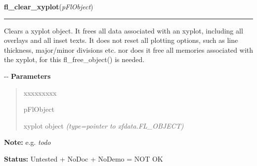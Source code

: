 \hspace{.8\funcindent}\begin{boxedminipage}{\funcwidth}

    \raggedright \textbf{fl\_clear\_xyplot}(\textit{pFlObject})

    \vspace{-1.5ex}

    \rule{\textwidth}{0.5\fboxrule}
\setlength{\parskip}{2ex}

Clears a xyplot object. It frees all data associated with an xyplot,
including all overlays and all inset texts. It does not reset all
plotting options, such as line thickness, major/minor divisions etc. nor
does it free all memories associated with the xyplot, for this
fl\_free\_object() is needed.

-{}-
\setlength{\parskip}{1ex}
      \textbf{Parameters}
      \vspace{-1ex}

      \begin{quote}
        \begin{Ventry}{xxxxxxxxx}

          \item[pFlObject]


xyplot object
            {\it (type=pointer to xfdata.FL\_OBJECT)}

        \end{Ventry}

      \end{quote}

\textbf{Note:} 
e.g. \emph{todo}


\textbf{Status:} 
Untested + NoDoc + NoDemo = NOT OK


    \end{boxedminipage}

    \label{xformslib:flxyplot:fl_set_xyplot_linewidth}

    \vspace{0.5ex}

